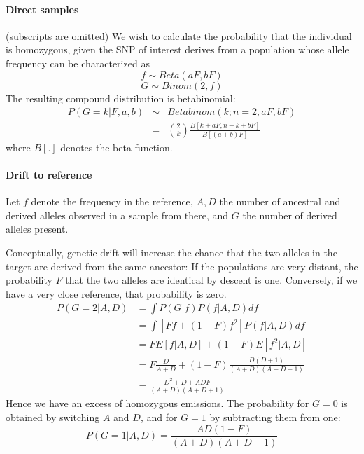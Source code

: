 \documentclass[10pt,a4paper]{article}
\begin{document}
\paragraph{Direct samples}
(subscripts are omitted) We wish to calculate the probability that the individual is homozygous, given the SNP of interest derives from a population whose allele frequency can be characterized as
$$f \sim Beta(aF, bF)$$
$$G \sim Binom(2, f)$$
The resulting compound distribution is  betabinomial:
\begin{eqnarray}
P(G=k | F, a, b) &\sim& Betabinom(k; n=2, aF, bF)\nonumber\\
&=& \binom{2}{k} \frac{B[k+a F, n-k + b F]}{B[ (a + b) F]} \label{eq:ll:homo}
\end{eqnarray}
where $B[.]$ denotes the beta function.
\paragraph{Drift to reference}
Let $f$ denote the frequency in the reference, $A, D$ the number of ancestral and derived alleles observed in a 
sample from there, and $G$ the number of derived alleles present.

Conceptually, genetic drift will increase the chance that the two alleles in the target are derived from the same ancestor: If the populations are very distant, the probability $F$ that the two alleles are identical by descent is one.  Conversely, if we have a very close reference, that probability is zero. 
\begin{align}
P(G=2 | A,D) &= \int P(G|f) P(f | A, D) df\nonumber\\
&= \int \left[ F f + (1-F) f^2\right] P(f | A, D) df\nonumber\\
&= F E[f|A, D] + (1-F)  E[f^2|A, D]\nonumber\\
&= F \frac{D}{A+D} + (1-F)  \frac{D (D+1)}{(A+D)(A+D+1)}\nonumber\\
&= \frac{D^2 + D + ADF}{(A+D)(A+D+1)}
\end{align}
Hence we have an excess of homozygous emissions. The probability for $G=0$ is obtained by switching $A$ and $D$, and for $G=1$ by subtracting them from one:
\begin{equation}
P(G=1 | A,D) = \frac{AD(1-F)}{(A+D)(A+D+1)}
\end{equation} 
\end{document}
